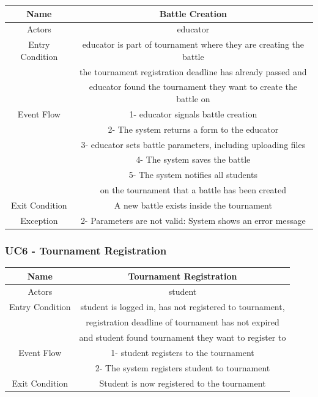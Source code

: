\documentclass{article}
\begin{document}
\begin{tabular*}{\linewidth}{ cc }
    \hline
    Name & Battle Creation \\ 
    \hline
    Actors & educator\\ 
    \hline
    Entry Condition & educator is part of tournament where they are creating the battle\\  
                    & the tournament registration deadline has already passed and\\
                    & educator found the tournament they want to create the battle on\\
    \hline
    Event Flow & 1- educator signals battle creation\\
               & 2- The system returns a form to the educator\\
               & 3- educator sets battle parameters, including uploading files\\
               & 4- The system saves the battle\\
               & 5- The system notifies all students \\
               & on the tournament that a battle has been created\\

    \hline
    Exit Condition & A new battle exists inside the tournament\\
    \hline
    Exception & 2- Parameters are not valid: System shows an error message\\
    \hline
\end{tabular*}

\subsubsection*{UC6 - Tournament Registration}

\begin{tabular*}{\linewidth}{@{\extracolsep{\fill}} cc }
    \hline
    Name & Tournament Registration \\ 
    \hline
    Actors & student\\ 
    \hline
    Entry Condition & student is logged in, has not registered to tournament,\\
                    & registration deadline of tournament has not expired\\
                    & and student found tournament they want to register to\\
    \hline
    Event Flow & 1- student registers to the tournament\\
               & 2- The system registers student to tournament\\
    \hline
    Exit Condition & Student is now registered to the tournament\\
    \hline
\end{tabular*}
\end{document}
